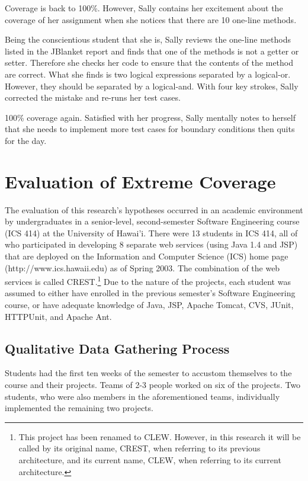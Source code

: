 Coverage is back to 100\%.  However, Sally contains her excitement about
the coverage of her assignment when she notices that there are 10 one-line
methods.

Being the conscientious student that she is, Sally reviews the one-line
methods listed in the JBlanket report and finds that one of the methods is
not a getter or setter.  Therefore she checks her code to ensure that the
contents of the method are correct.  What she finds is two logical
expressions separated by a logical-or.  However, they should be separated
by a logical-and.  With four key strokes, Sally corrected the mistake and
re-runs her test cases.

100\% coverage again.  Satisfied with her progress, Sally mentally notes to
herself that she needs to implement more test cases for boundary conditions
then quits for the day.

\chapter{Evaluation of Extreme Coverage}
The evaluation of this research's hypotheses occurred in an academic
environment by undergraduates in a senior-level, second-semester Software
Engineering course (ICS 414) at the University of Hawai'i.  There were 13
students in ICS 414, all of who participated in developing 8 separate web
services (using Java 1.4 and JSP) that are deployed on the Information and
Computer Science (ICS) home page (http://www.ics.hawaii.edu) as of Spring
2003. The combination of the web services is called CREST.\footnote{This
project has been renamed to CLEW.  However, in this research it will be
called by its original name, CREST, when referring to its previous
architecture, and its current name, CLEW, when referring to its current
architecture.} Due to the nature of the projects, each student was assumed
to either have enrolled in the previous semester's Software Engineering
course, or have adequate knowledge of Java, JSP, Apache Tomcat, CVS, JUnit,
HTTPUnit, and Apache Ant.

\section{Qualitative Data Gathering Process}
Students had the first ten weeks of the semester to accustom themselves to
the course and their projects.  Teams of 2-3 people worked on six of the
projects.  Two students, who were also members in the aforementioned teams,
individually implemented the remaining two projects.

